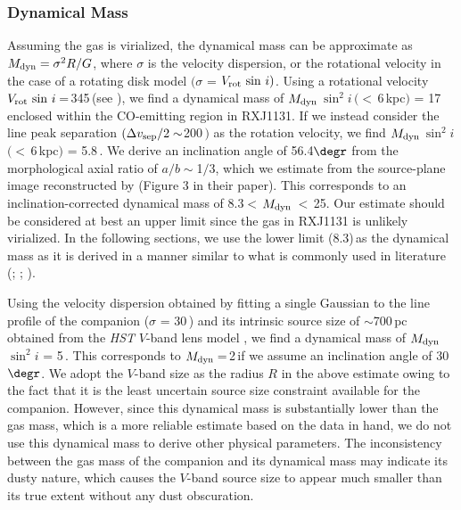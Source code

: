 \documentclass[]{emulateapj}
\begin{document}
\subsubsection{Dynamical Mass}
Assuming the gas is virialized,
the dynamical mass can be approximate as
$M_{\rm dyn} = \sigma^2 R / G$,
where $\sigma$ is the velocity dispersion, or the rotational velocity in the case of a rotating disk model
$($\ie $\sigma$ = $V_{\rm rot}\, \sin\, i)$.
Using a rotational velocity $V_{\rm rot} \, \sin\, i$\,=\,345\,\kms (see ),  %
we find a dynamical mass of
$M_{\rm dyn}$\,$\sin^2 i$\,$(<$\,6\,kpc$)$ = 17\,\Msun enclosed
within the CO-emitting region in RXJ1131.
If we instead consider the
\bco line peak separation $(\Delta v_{\rm sep}/2 \sim$200\,\kms$)$ as the rotation velocity, we find
$M_{\rm dyn}$\,$\sin^2 i$\,$(<$\,6\,kpc$)$ = 5.8\,\Msun.
We derive an inclination angle of 56.4$\degr$ from the
morphological axial ratio of $a/b\sim$1$/$3, which we estimate
from the source-plane image reconstructed by  (Figure 3 in their paper).  
This corresponds to an inclination-corrected dynamical mass of
8.3\Msun$<$\,$M_{\rm dyn}$\,$<$\,25\Msun.
Our estimate should be considered at best an upper limit since
the gas in RXJ1131 is unlikely virialized.
In the following sections, we use the
lower limit (8.3)\,\Msun as the dynamical mass as it is
derived in a manner similar to what is commonly used in literature 
(\eg {}; \citealt[hereafter DS98]{Downes98a}; ).

Using the velocity dispersion obtained by fitting a single Gaussian to the
line profile of the companion ($\sigma$ = 30\,\kms)
and its intrinsic source size of $\sim$700\,pc obtained from the {\em HST}
$V$-band lens model ,
we find a dynamical mass of $M_{\rm dyn}$\,$\sin^2 i$ = 5\,\Msun.
This corresponds to $M_{\rm dyn}$\,=\,2\,\Msun if we assume an
inclination angle of 30$\degr$.
We adopt the $V$-band size as the radius $R$ in the above estimate 
owing to the fact that it is the least uncertain source size constraint available for the companion.
However, since this dynamical mass is substantially lower than the gas mass, which is 
a more reliable estimate based on the data in hand, 
we do not use this dynamical mass to derive other physical parameters.
The inconsistency between the gas mass of the companion and its dynamical mass
may indicate its dusty nature, which causes the $V$-band source size to 
appear much smaller than its true extent without any dust obscuration.
\end{document}
